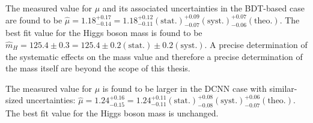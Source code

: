 The measured value for $\mu$ and its associated uncertainties in the BDT-based case are found to be $\hat{\mu} = 1.18^{+0.17}_{-0.14} = 1.18^{+0.12}_{-0.11}(\mathrm{stat.})^{+0.09}_{-0.07}(\mathrm{syst.})^{+0.07}_{-0.06}(\mathrm{theo.})$.
The best fit value for the Higgs boson mass is found to be $\hat{m}_{H}=125.4\pm{0.3}=125.4\pm{0.2}(\mathrm{stat}.)\pm{0.2}(\mathrm{syst}.)$. 
A precise determination of the systematic effects on the mass value and therefore a precise determination of the mass itself are beyond the scope of this thesis.

The measured value for $\mu$ is found to be larger in the DCNN case with similar-sized uncertainties: $\hat{\mu} = 1.24^{+0.16}_{-0.15} = 1.24^{+0.11}_{-0.11}(\mathrm{stat.})^{+0.08}_{-0.08}(\mathrm{syst.})^{+0.06}_{-0.07}(\mathrm{theo.})$.
The best fit value for the Higgs boson mass is unchanged. 














